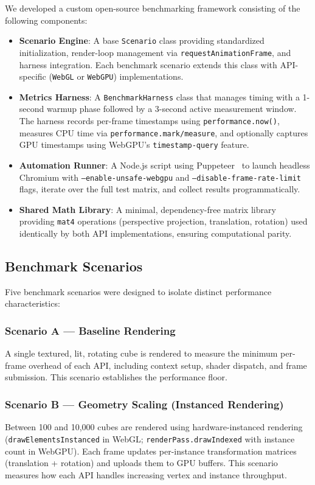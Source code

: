 \documentclass[conference]{IEEEtran}
\begin{document}
We developed a custom open-source benchmarking framework consisting of the following components:

\begin{itemize}
    \item \textbf{Scenario Engine}: A base \texttt{Scenario} class providing standardized initialization, render-loop management via \texttt{requestAnimationFrame}, and harness integration. Each benchmark scenario extends this class with API-specific (\texttt{WebGL} or \texttt{WebGPU}) implementations.
    \item \textbf{Metrics Harness}: A \texttt{BenchmarkHarness} class that manages timing with a 1-second warmup phase followed by a 3-second active measurement window. The harness records per-frame timestamps using \texttt{performance.now()}, measures CPU time via \texttt{performance.mark/measure}, and optionally captures GPU timestamps using WebGPU's \texttt{timestamp-query} feature.
    \item \textbf{Automation Runner}: A Node.js script using Puppeteer~\cite{puppeteer2024} to launch headless Chromium with \texttt{--enable-unsafe-webgpu} and \texttt{--disable-frame-rate-limit} flags, iterate over the full test matrix, and collect results programmatically.
    \item \textbf{Shared Math Library}: A minimal, dependency-free matrix library providing \texttt{mat4} operations (perspective projection, translation, rotation) used identically by both API implementations, ensuring computational parity.
\end{itemize}

\subsection{Benchmark Scenarios}

Five benchmark scenarios were designed to isolate distinct performance characteristics:

\subsubsection{Scenario A --- Baseline Rendering}
A single textured, lit, rotating cube is rendered to measure the minimum per-frame overhead of each API, including context setup, shader dispatch, and frame submission. This scenario establishes the performance floor.

\subsubsection{Scenario B --- Geometry Scaling (Instanced Rendering)}
Between 100 and 10{,}000 cubes are rendered using hardware-instanced rendering (\texttt{drawElementsInstanced} in WebGL; \texttt{renderPass.drawIndexed} with instance count in WebGPU). Each frame updates per-instance transformation matrices (translation + rotation) and uploads them to GPU buffers. This scenario measures how each API handles increasing vertex and instance throughput.
\end{document}
